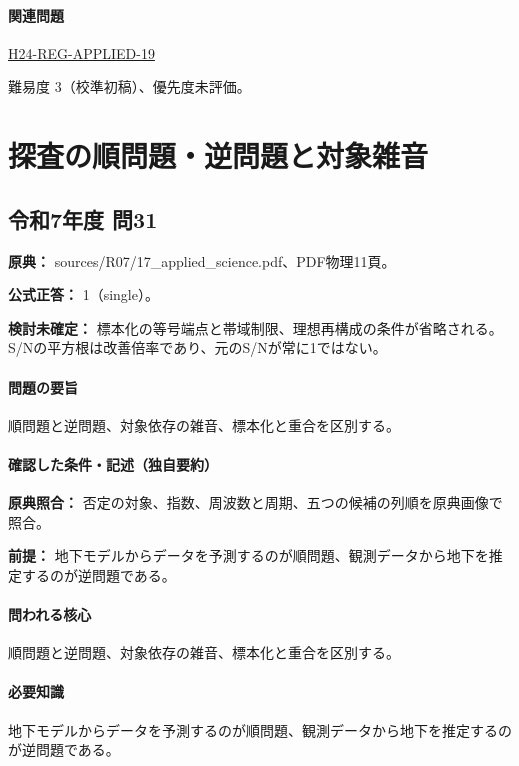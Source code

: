 \paragraph{関連問題} \hyperref[q:h24-reg-applied-19]{H24-REG-APPLIED-19}

\par 難易度 3（校準初稿）、優先度未評価。

\section{探査の順問題・逆問題と対象雑音}

\subsection{令和7年度 問31}
\label{q:r07-reg-applied-31}

\noindent\textbf{原典：} sources/R07/17\_applied\_science.pdf、PDF物理11頁。

\textbf{公式正答：} 1（single）。

\par\textbf{検討未確定：} 標本化の等号端点と帯域制限、理想再構成の条件が省略される。S/Nの平方根は改善倍率であり、元のS/Nが常に1ではない。

\paragraph{問題の要旨} 順問題と逆問題、対象依存の雑音、標本化と重合を区別する。

\paragraph{確認した条件・記述（独自要約）}\mbox{}\par

\noindent\textbf{原典照合：} 否定の対象、指数、周波数と周期、五つの候補の列順を原典画像で照合。\par

\noindent\textbf{前提：} 地下モデルからデータを予測するのが順問題、観測データから地下を推定するのが逆問題である。\par

\paragraph{問われる核心} 順問題と逆問題、対象依存の雑音、標本化と重合を区別する。

\paragraph{必要知識} 地下モデルからデータを予測するのが順問題、観測データから地下を推定するのが逆問題である。

